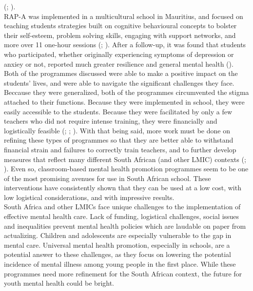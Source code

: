 \documentclass[fontsize=14bp]{article}
\begin{document}
(\cite{Osetal20b}; \cite{Oseral21}). \\
RAP-A was implemented in a multicultural school in Mauritius, and focused on
teaching students strategies built on cognitive behavioural concepts to bolster
their self-esteem, problem solving skills, engaging with support networks, and
more over 11 one-hour sessions (\cite{barryetal13}; \cite{riduvetal11}). After a
follow-up, it was found that students who participated, whether originally
experiencing symptoms of depression or anxiey or not, reported much greater
resilience and general mental health (\cite{riduvetal11}). \\
Both of the programmes discussed were able to make a positive impact on the
students' lives, and were able to navigate the significant challenges they face.
Beccause they were generalized, both of the programmes circumvented the stigma
attached to their functions. Because they were implemented in school, they were
easily accessible to the students. Because they were facilitated by only a few
teachers who did not require intense training, they were financially and
logistically feasible (\cite{Osetal20b}; \cite{Oseral21}; \cite{riduvetal11}).
With that being said, more work must be done on refining these types of
programmes so that they are better able to withstand financial strain and
failures to correctly train teachers, and to further develop measures that
reflect many different South African (and other LMIC) contexts
(\cite{barryetal13}; \cite{oretal18}). Even so, classroom-based mental health
promotion programmes seem to be one of the most promising avenues for use in
South African school. These interventions have consistently shown that they can
be used at a low cost, with low logistical considerations, and with impressive
results. \\
South Africa and other LMICs face unique challenges to the implementation of
effective mental health care. Lack of funding, logistical challenges, social
issues and inequalities prevent mental health policies which are laudable on
paper from actualizing. Children and adolescents are especially vulnerable to
the gap in mental care. Universal mental health promotion, especially in
schools, are a potential answer to these challenges, as they focus on lowering
the potential incidence of mental illness among young people in the first place.
While these programmes need more refinement for the South African context, the
future for youth mental health could be bright.
   \newpage
   \printbibliography
\end{document}
